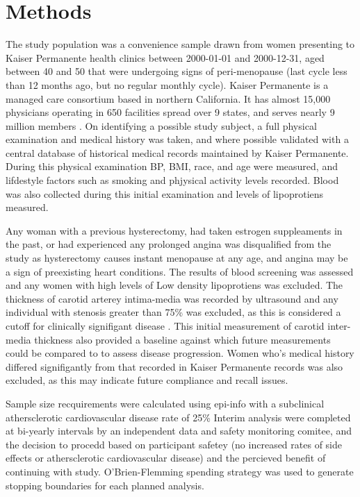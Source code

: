 \documentclass[11pt]{article}
\begin{document}
	\section{Methods} 
		The study population was a convenience sample drawn from women presenting to Kaiser Permanente health clinics between 2000-01-01 and 2000-12-31, aged between 40 and 50 that were undergoing signs of peri-menopause (last cycle less than 12 months ago, but no regular monthly cycle).
		Kaiser Permanente is a managed care consortium based in northern California. It has almost 15,000 physicians operating in 650 facilities spread over 9 states, and serves nearly 9 million members \cite{Rauber}.
		On identifying a possible study subject, a full physical examination and medical history was taken, and where possible validated with a central database of historical medical records maintained by Kaiser Permanente.
		During this physical examination BP, BMI, race, and age were measured, and lifdestyle factors such as smoking and phjysical activity levels recorded.
		Blood was also collected during this initial examination and levels of lipoprotiens measured.


		Any woman with a previous hysterectomy, had taken estrogen suppleaments in the past, or had experienced any prolonged angina was disqualified from the study as hysterectomy causes instant menopause at any age, and angina may be a sign of preexisting heart conditions.
		The results of blood screening was assessed and any women with high levels of Low density lipoprotiens was excluded.
		The thickness of carotid arterey intima-media was recorded  by ultrasound and any individual with stenosis greater than 75\% was excluded, as this is considered a cutoff for clinically signifigant disease \cite{Maseri2003}. 
		This initial measurement of carotid inter-media thickness also provided a baseline against which future measurements could be compared to to assess disease progression.
		Women who's medical history differed signifigantly from that recorded in Kaiser Permanente records was also excluded, as this may indicate future compliance and recall issues.
		

		Sample size recquirements were calculated using epi-info with a subclinical athersclerotic cardiovascular disease rate of 25\%
		Interim analysis were completed at bi-yearly intervals by an independent data and safety monitoring comitee, and the decision to procedd based on participant safetey (no increased rates of side effects or athersclerotic cardiovascular disease) and the percieved benefit of continuing with study.
		O’Brien-Flemming spending strategy was used to generate stopping boundaries for each planned analysis.
\end{document}

